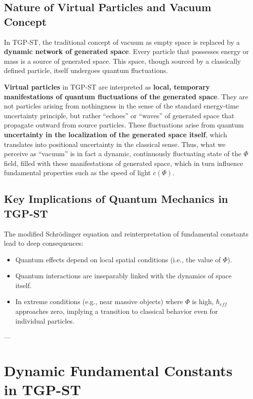 \documentclass[11pt,a4paper]{article}
\begin{document}
\subsection{Nature of Virtual Particles and Vacuum Concept}
In TGP-ST, the traditional concept of vacuum as empty space is replaced by a \textbf{dynamic network of generated space}. Every particle that possesses energy or mass is a source of generated space. This space, though sourced by a classically defined particle, itself undergoes quantum fluctuations.

\textbf{Virtual particles} in TGP-ST are interpreted as \textbf{local, temporary manifestations of quantum fluctuations of the generated space}. They are not particles arising from nothingness in the sense of the standard energy-time uncertainty principle, but rather “echoes” or “waves” of generated space that propagate outward from source particles. These fluctuations arise from quantum \textbf{uncertainty in the localization of the generated space itself}, which translates into positional uncertainty in the classical sense. Thus, what we perceive as “vacuum” is in fact a dynamic, continuously fluctuating state of the $\Phi$ field, filled with these manifestations of generated space, which in turn influence fundamental properties such as the speed of light $c(\Phi)$.

\subsection{Key Implications of Quantum Mechanics in TGP-ST}
The modified Schrödinger equation and reinterpretation of fundamental constants lead to deep consequences:
\begin{itemize}
    \item Quantum effects depend on local spatial conditions (i.e., the value of $\Phi$).
    \item Quantum interactions are inseparably linked with the dynamics of space itself.
    \item In extreme conditions (e.g., near massive objects) where $\Phi$ is high, $\hbar_{eff}$ approaches zero, implying a transition to classical behavior even for individual particles.
\end{itemize}

---

\section{Dynamic Fundamental Constants in TGP-ST}
\label{sec:StaleDynamiczne}
\end{document}
